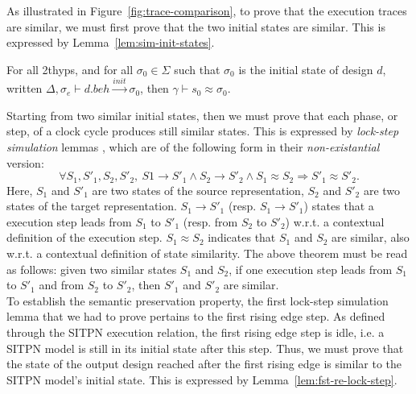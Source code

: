 As illustrated in Figure~\ref{fig:trace-comparison}, to prove that the
execution traces are similar, we must first prove that the two initial
states are similar. This is expressed by
Lemma~\ref{lem:sim-init-states}.
\begin{lemma}
  \label{lem:sim-init-states}
  For all \hm2thyps{}, and for all $\sigma_0\in{}\Sigma$ such that
  $\sigma_0$ is the initial state of design $d$, written
  $\Delta,\sigma_e\vdash{}d.beh\xrightarrow{init}\sigma_0$, then
  $\gamma\vdash{}s_0\approx\sigma_0$.
\end{lemma}

Starting from two similar initial states, then we must prove that each
phase, or step, of a clock cycle produces still similar states.  This
is expressed by \textit{lock-step simulation} lemmas \cite{Leroy2009},
which are of the following form in their \textit{non-existantial}
version:
\begin{equation*}
  \forall{}S_1,S'_1,S_2,S'_2,~S1\rightarrow{}S'_1\land{}S_2\rightarrow{}S'_2\land{}S_1\approx{}S_2\Rightarrow{}S'_1\approx{}S'_2.
\end{equation*}
Here, $S_1$ and $S'_1$ are two states of the source representation,
$S_2$ and $S'_2$ are two states of the target representation.
$S_1\rightarrow{}S'_1$ (resp. $S_1\rightarrow{}S'_1$) states that a
execution step leads from $S_1$ to $S'_1$ (resp. from $S_2$ to $S'_2$)
w.r.t. a contextual definition of the execution
step. $S_1\approx{}S_2$ indicates that $S_1$ and $S_2$ are similar,
also w.r.t. a contextual definition of state similarity. The above
theorem must be read as follows: given two similar states $S_1$ and
$S_2$, if one execution step leads from $S_1$ to $S'_1$ and from $S_2$
to $S'_2$, then $S'_1$ and $S'_2$ are similar. \\

To establish the semantic preservation property, the first lock-step
simulation lemma that we had to prove pertains to the first rising
edge step. As defined through the SITPN execution relation, the first
rising edge step is idle, i.e. a SITPN model is still in its initial
state after this step. Thus, we must prove that the state of the
output design reached after the first rising edge is similar to the
SITPN model's initial state. This is expressed by
Lemma~\ref{lem:fst-re-lock-step}.


